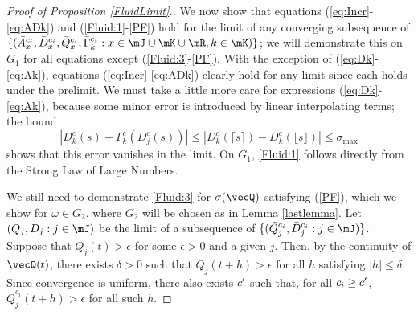 \documentclass{amsart}
\begin{document}
\begin{proof}[Proof of Proposition \ref{FluidLimit}.]
We now show that equations (\ref{eq:Incr}-\ref{eq:ADk}) and (\ref{Fluid:1}-\ref{PF}) hold for 
the limit of any 
converging subsequence of $\{ (\bar{A}^{c_i}_x, \bar{D}^{c_i}_x,\bar{Q}^{c_i}_x,\bar{\Gamma}_k^{c_i} : x\in \mJ \cup\mK \cup \mR, k\in\mK) \}$; we will demonstrate this on $G_1$ for
all equations except (\ref{Fluid:3}-\ref{PF}).
With the exception of (\ref{eq:Dk}-\ref{eq:Ak}), equations (\ref{eq:Incr}-\ref{eq:ADk}) 
clearly hold for any limit since each holds under the prelimit. We must take a little more care for expressions 
(\ref{eq:Dk}-\ref{eq:Ak}),  because some minor error is introduced by linear interpolating terms; the bound
\begin{equation*}
\left| D^{c}_k(s) - \Gamma^{c}_k(D^c_j(s)) \right| \leq \left| D^c_k(\lceil s \rceil) - D^c_k(\lfloor s\rfloor)\right| \leq \sigma_{\max}
\end{equation*}
shows that this error vanishes in the limit. 
On $G_1$, \eqref{Fluid:1} follows directly from the Strong Law of Large Numbers. 

We still need to demonstrate \eqref{Fluid:3} for $\sigma (\vecQ)$ satisfying (\ref{PF}), which we show for $\omega \in G_2$,
where $G_2$ will be chosen as in Lemma \ref{lastlemma}.
Let $(Q_j,D_j : j\in\mJ)$ be the limit of a subsequence of $\{ (\bar{Q}_j^{c_i}, \bar{D}_j^{c_i}: j\in\mJ ) \}$. Suppose that $Q_j(t)>\epsilon$ for some $\epsilon>0$ and a given $j$.  Then, by the continuity of $\vecQ(t)$, there exists $\delta>0$ such that $Q_j(t+h)>\epsilon$ for all $h$ satisfying $|h|\le \delta$. Since convergence is uniform, there also exists $c\rq{}$ such that, for all $c_i\ge c\rq{}$, $\bar{Q}^{c_i}_j(t+h)>\epsilon$ for all such $h$. 


\end{proof}
\end{document}
